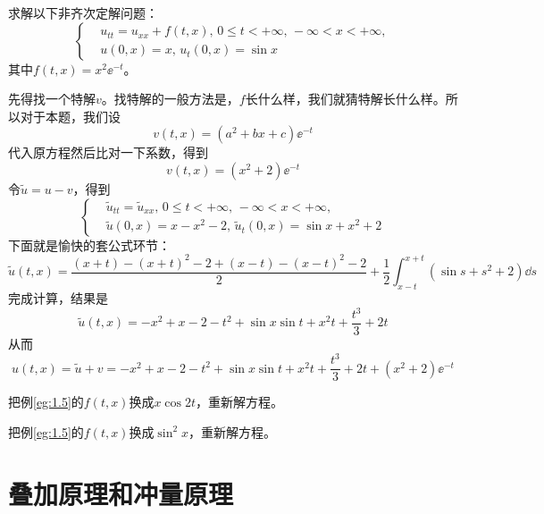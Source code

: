 \begin{problembox}
    \begin{example}\label{eg:1.5}
        求解以下非齐次定解问题：
        \begin{equation*}
            \left\{
                \begin{aligned}
                    &u_{tt} = u_{xx} + f(t, x),\, 0 \leq t < +\infty,\, -\infty < x < +\infty,\\
                    &u(0, x) = x,\, u_t(0, x) = \sin x
                \end{aligned}
            \right.
        \end{equation*}
        其中$f(t, x) = x^2 \ee^{-t}$。
    \end{example}
    \begin{solution}
        先得找一个特解$v$。找特解的一般方法是，$f$长什么样，我们就猜特解长什么样。所以对于本题，我们设
        \[v(t, x) = \left(a^2 + b x + c\right)\ee^{-t}\]
        代入原方程然后比对一下系数，得到
        \[v(t, x) = \left(x^2 + 2\right) \ee^{-t}\]
        令$\tilde{u} = u - v$，得到
        \begin{equation*}
            \left\{
                \begin{aligned}
                    &\tilde{u}_{tt} = \tilde{u}_{xx},\, 0 \leq t < +\infty,\, -\infty < x < +\infty,\\
                    &\tilde{u}(0, x) = x - x^2 - 2,\, \tilde{u}_t(0, x) = \sin x + x^2 + 2
                \end{aligned}
            \right.
        \end{equation*}
        下面就是愉快的套公式环节：
        \[\tilde{u}(t, x) = \frac{\left(x + t\right) - \left(x + t\right)^2 - 2 + \left(x - t\right) - \left(x - t\right)^2 - 2}{2} + \frac{1}{2}\int_{x - t}^{x + t} \left(\sin s + s^2 + 2\right) \dd{s}\]
        完成计算，结果是
        \[\tilde{u}(t, x) = -x^2 + x - 2 - t^2 + \sin x \sin t + x^2 t + \frac{t^3}{3} + 2 t\]
        从而
        \[u(t, x) = \tilde{u} + v = -x^2 + x - 2 - t^2 + \sin x \sin t + x^2 t + \frac{t^3}{3} + 2 t + \left(x^2 + 2\right) \ee^{-t}\]
    \end{solution}
\end{problembox}
\begin{problembox}
    \begin{exercise}
        把例\ref{eg:1.5}的$f(t, x)$换成$x \cos 2t$，重新解方程。
    \end{exercise}
    \begin{exercise}
        把例\ref{eg:1.5}的$f(t, x)$换成$\sin^2 x$，重新解方程。
    \end{exercise}
\end{problembox}
\section{叠加原理和冲量原理}